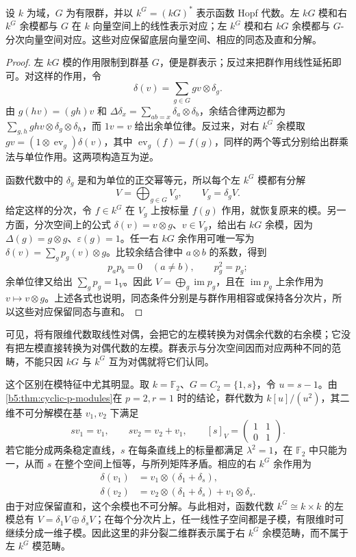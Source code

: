 \begin{proposition}\label{b5:prop:finite-group-module-comodule}
	设 \(k\) 为域，\(G\) 为有限群，并以 \(k^G=(kG)^*\) 表示函数 Hopf 代数。左 \(kG\) 模和右 \(k^G\) 余模都与 \(G\) 在 \(k\) 向量空间上的线性表示对应；左 \(k^G\) 模和右 \(kG\) 余模都与 \(G\)-分次向量空间对应。这些对应保留底层向量空间、相应的同态及直和分解。
\end{proposition}
\begin{proof}
	左 \(kG\) 模的作用限制到群基 \(G\)，便是群表示；反过来把群作用线性延拓即可。对这样的作用，令
	\[
		\delta(v)=\sum_{g\in G}gv\otimes\delta_g.
	\]
	由 \(g(hv)=(gh)v\) 和 \(\Delta\delta_x=\sum_{ab=x}\delta_a\otimes\delta_b\)，余结合律两边都为 \(\sum_{g,h}ghv\otimes\delta_g\otimes\delta_h\)，而 \(1v=v\) 给出余单位律。反过来，对右 \(k^G\) 余模取 \(gv=(1\otimes\operatorname{ev}_g)\delta(v)\)，其中 \(\operatorname{ev}_g(f)=f(g)\)，同样的两个等式分别给出群乘法与单位作用。这两项构造互为逆。

	函数代数中的 \(\delta_g\) 是和为单位的正交幂等元，所以每个左 \(k^G\) 模都有分解
	\[
		V=\bigoplus_{g\in G}V_g,\qquad V_g=\delta_gV.
	\]
	给定这样的分次，令 \(f\in k^G\) 在 \(V_g\) 上按标量 \(f(g)\) 作用，就恢复原来的模。另一方面，分次空间上的公式 \(\delta(v)=v\otimes g\)、\(v\in V_g\)，给出右 \(kG\) 余模，因为 \(\Delta(g)=g\otimes g\)、\(\varepsilon(g)=1\)。任一右 \(kG\) 余作用可唯一写为 \(\delta(v)=\sum_g p_g(v)\otimes g\)。比较余结合律中 \(a\otimes b\) 的系数，得到
	\[
		p_ap_b=0\quad(a\ne b),\qquad p_g^2=p_g;
	\]
	余单位律又给出 \(\sum_g p_g=1_V\)。因此 \(V=\bigoplus_g\operatorname{im}p_g\)，且在 \(\operatorname{im}p_g\) 上余作用为 \(v\mapsto v\otimes g\)。上述各式也说明，同态条件分别是与群作用相容或保持各分次片，所以这些对应保留同态与直和。
\end{proof}
可见，将有限维代数取线性对偶，会把它的左模转换为对偶余代数的右余模；它没有把左模直接转换为对偶代数的左模。群表示与分次空间因而对应两种不同的范畴，不能只因 \(kG\) 与 \(k^G\) 互为对偶就将它们认同。

\ProseParagraphBreak
这个区别在模特征中尤其明显。取 \(k=\mathbb F_2\)、\(G=C_2=\{1,s\}\)，令 \(u=s-1\)。由\cref{b5:thm:cyclic-p-modules}在 \(p=2,r=1\) 时的结论，群代数为 \(k[u]/(u^2)\)，其二维不可分解模在基 \(v_1,v_2\) 下满足
\[
	sv_1=v_1,\qquad sv_2=v_2+v_1,\qquad
	[s]_V=\begin{pmatrix}1&1\\0&1\end{pmatrix}.
\]
若它能分成两条稳定直线，\(s\) 在每条直线上的标量都满足 \(\lambda^2=1\)，在 \(\mathbb F_2\) 中只能为一，从而 \(s\) 在整个空间上恒等，与所列矩阵矛盾。相应的右 \(k^G\) 余作用为
\[
	\begin{aligned}
		\delta(v_1)&=v_1\otimes(\delta_1+\delta_s),\\
		\delta(v_2)&=v_2\otimes(\delta_1+\delta_s)+v_1\otimes\delta_s.
	\end{aligned}
\]
由于对应保留直和，这个余模也不可分解。与此相对，函数代数 \(k^G\cong k\times k\) 的左模总有 \(V=\delta_1V\oplus\delta_sV\)；在每个分次片上，任一线性子空间都是子模，有限维时可继续分成一维子模。因此这里的非分裂二维群表示属于右 \(k^G\) 余模范畴，而不属于左 \(k^G\) 模范畴。

